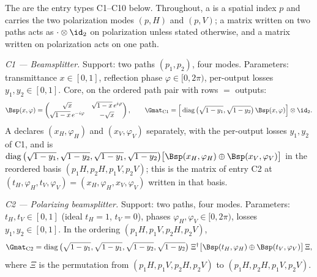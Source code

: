 \begin{definition}\label{def:catalogue-entries}
The  are the entry types C1--C10 below.
Throughout, a  is a spatial index $p$ and carries the two
polarization modes $(p,H)$ and $(p,V)$; a matrix written on two paths acts as
$\cdot\otimes\id_2$ on polarization unless stated otherwise, and a matrix
written on polarization acts on one path.

\emph{C1 --- Beamsplitter.} Support: two paths $(p_1,p_2)$, four modes.
Parameters: transmittance $x\in[0,1]$, reflection phase
$\varphi\in[0,2\pi)$, per-output losses $y_1,y_2\in[0,1]$. Core, on the ordered
path pair with rows $=$ outputs:
\begin{equation}\label{eq:bs}
  \Bsp(x,\varphi)=
  \begin{pmatrix}
    \sqrt{x} & \sqrt{1-x}\,e^{i\varphi}\\[2pt]
    \sqrt{1-x}\,e^{-i\varphi} & -\sqrt{x}
  \end{pmatrix},
  \qquad
  \Gmat_{\mathrm{C1}}=
  \Big[\operatorname{diag}\big(\sqrt{1-y_1},\sqrt{1-y_2}\big)\,
       \Bsp(x,\varphi)\Big]\otimes\id_2 .
\end{equation}
A  declares $(x_H,\varphi_H)$ and
$(x_V,\varphi_V)$ separately, with the per-output losses $y_1,y_2$ of C1, and
is
$\operatorname{diag}\big(\sqrt{1-y_1},\sqrt{1-y_2},\sqrt{1-y_1},\sqrt{1-y_2}\big)
\big[\Bsp(x_H,\varphi_H)\oplus\Bsp(x_V,\varphi_V)\big]$ in the reordered basis
$(p_1H,p_2H,p_1V,p_2V)$; this is the matrix of entry C2 at
$(t_H,\varphi_H,t_V,\varphi_V)=(x_H,\varphi_H,x_V,\varphi_V)$ written in that
basis.

\emph{C2 --- Polarizing beamsplitter.} Support: two paths, four modes.
Parameters: $t_H,t_V\in[0,1]$ (ideal $t_H=1$, $t_V=0$), phases
$\varphi_H,\varphi_V\in[0,2\pi)$, losses $y_1,y_2\in[0,1]$. In the ordering
$(p_1H,p_1V,p_2H,p_2V)$,
\begin{equation}\label{eq:pbs}
  \Gmat_{\mathrm{C2}}=
  \operatorname{diag}\big(\sqrt{1-y_1},\sqrt{1-y_1},
                          \sqrt{1-y_2},\sqrt{1-y_2}\big)\;
  \Xi^\dagger\big[\Bsp(t_H,\varphi_H)\oplus\Bsp(t_V,\varphi_V)\big]\,\Xi ,
\end{equation}
where $\Xi$ is the permutation from $(p_1H,p_1V,p_2H,p_2V)$ to
$(p_1H,p_2H,p_1V,p_2V)$.


\end{definition}
